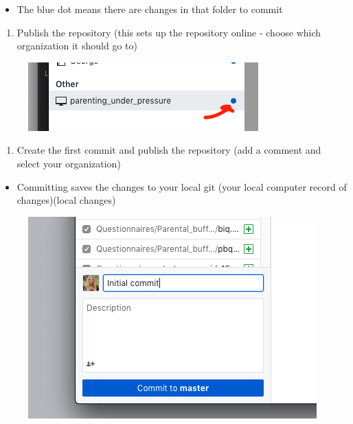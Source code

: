 \documentclass[]{book}
\providecommand{\tightlist}{%
  \setlength{\itemsep}{0pt}\setlength{\parskip}{0pt}}
\begin{document}
\begin{itemize}
\tightlist
\item
  The blue dot means there are changes in that folder to commit
\end{itemize}

\begin{enumerate}
\def\labelenumi{\arabic{enumi}.}
\setcounter{enumi}{5}
\tightlist
\item
  Publish the repository (this sets up the repository online - choose which organization it should go to)
\end{enumerate}

\begin{figure}
\centering
\includegraphics{images/research_protocols/github/6.png}
\caption{}
\end{figure}

\begin{enumerate}
\def\labelenumi{\arabic{enumi}.}
\setcounter{enumi}{6}
\tightlist
\item
  Create the first commit and publish the repository (add a comment and select your organization)
\end{enumerate}

\begin{itemize}
\tightlist
\item
  Committing saves the changes to your local git (your local computer record of changes)(local changes)
\end{itemize}

\begin{figure}
\centering
\includegraphics{images/research_protocols/github/11.png}
\caption{}
\end{figure}
\end{document}
